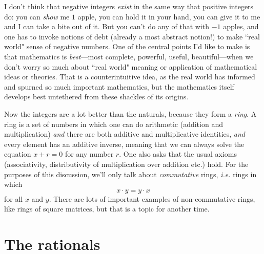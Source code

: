 \documentclass[11pt]{amsart}
\theoremstyle{plain}
\theoremstyle{definition}
\theoremstyle{remark}
\numberwithin{theorem}{section}
\numberwithin{equation}{section}
\begin{document}
I don't think that negative integers {\em exist} in the same way that positive integers do: you can {\em show} me $1$ apple, you can hold it in your hand,
you can give it to me and I can take a bite out of it.  But you can't do any of that with $-1$ apples, and one has to invoke notions of debt (already a most abstract notion!) to make ``real world" sense of negative numbers. One of the central points I'd like to make is that mathematics is {\em best}---most complete, powerful, useful, beautiful---when we don't worry so much about ``real world" meaning or application of mathematical ideas or theories.  That is a counterintuitive idea, 
as the real world has informed and spurned so much important mathematics, but the mathematics itself develops best untethered from these shackles of its origins.

Now the integers are a lot better than the naturals, because they form a {\em ring}.  A ring is a set of numbers in which one can do arithmetic
(addition and multiplication) {\em and} there are both additive and multiplicative identities, {\em and} every element has an additive inverse,
meaning that we can always solve the equation $x+r = 0$ for any number $r$.  One also asks that the usual axioms (associativity, distributivity of
multiplication over addition etc.) hold.  For the purposes of this discussion, we'll only talk about {\em commutative} rings, {\em i.e.} rings in which
$$x\cdot y = y\cdot x$$
for all $x$ and $y$.  There are lots of important examples of non-commutative rings, like rings of square matrices, but that is a topic for another time.


\section{The rationals}
\end{document}
